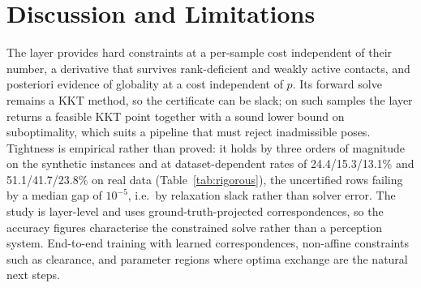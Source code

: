 \section{Discussion and Limitations}\label{sec:discussion}

The layer provides hard constraints at a per-sample cost independent of their number, a derivative that survives rank-deficient and weakly active contacts, and posteriori evidence of globality at a cost independent of $p$. Its forward solve remains a KKT method, so the certificate can be slack; on such samples the layer returns a feasible KKT point together with a sound lower bound on suboptimality, which suits a pipeline that must reject inadmissible poses. Tightness is empirical rather than proved: it holds by three orders of magnitude on the synthetic instances and at dataset-dependent rates of 24.4/15.3/13.1\% and 51.1/41.7/23.8\% on real data (Table~\ref{tab:rigorous}), the uncertified rows failing by a median gap of $10^{-5}$, i.e.\ by relaxation slack rather than solver error. The study is layer-level and uses ground-truth-projected correspondences, so the accuracy figures characterise the constrained solve rather than a perception system. End-to-end training with learned correspondences, non-affine constraints such as clearance, and parameter regions where optima exchange are the natural next steps.
